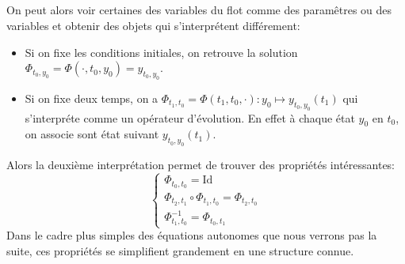 \subsection*{}
On peut alors voir certaines des variables du flot comme des paramêtres ou des variables et obtenir des objets qui s'interprétent différement:
\begin{itemize}
   \item Si on fixe les conditions initiales, on retrouve la solution \( \Phi_{t_0, y_0} = \Phi(\cdot, t_0, y_0) = y_{t_0, y_0} \).
   \item Si on fixe deux temps, on a \( \Phi_{t_1, t_0} = \Phi(t_1, t_0, \cdot) : y_0 \longmapsto y_{t_0, y_0}(t_1)\) qui s'interpréte comme un opérateur d'évolution. En effet à chaque état \( y_0 \) en \( t_0 \), on associe sont état suivant \( y_{t_0, y_0}(t_1) \).
\end{itemize}
Alors la deuxième interprétation permet de trouver des propriétés intéressantes:
\[ 
   \begin{cases}
      \Phi_{t_0, t_0} = \text{Id}\\
      \Phi_{t_2, t_1} \circ \Phi_{t_1, t_0} = \Phi_{t_2, t_0}\\
      \Phi_{t_1, t_0}^{-1} = \Phi_{t_0, t_1}
   \end{cases}
\]
Dans le cadre plus simples des équations autonomes que nous verrons pas la suite, ces propriétés se simplifient grandement en une structure connue.
